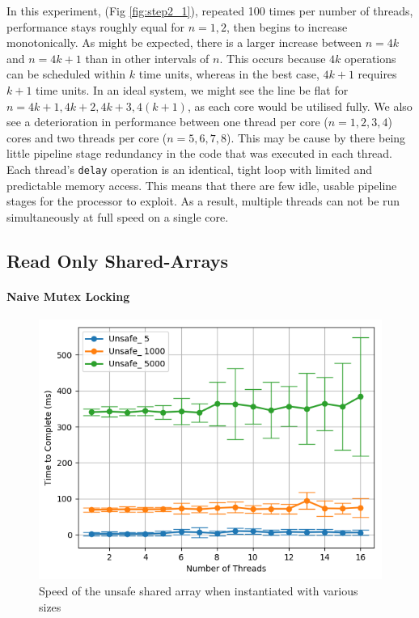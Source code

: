 \documentclass[11pt]{article}
\begin{document}
In this experiment, (Fig \ref{fig:step2_1}), repeated 100 times per number of threads, performance stays roughly equal for $n = 1, 2$, then begins to increase monotonically. As might be expected, there is a larger increase between $n= 4k$ and $n= 4k +1$ than in other intervals of $n$. This occurs because $4k$ operations can be scheduled within $k$ time units, whereas in the best case, $4k+1$ requires $k+1$ time units. In an ideal system, we might see the line be flat for $n = 4k+1, 4k+2, 4k+3, 4(k+1)$, as each core would be utilised fully. We also see a deterioration in performance between one thread per core ($n = 1, 2, 3, 4$) cores and two threads per core ($n = 5, 6, 7, 8$). This may be cause by there being little pipeline stage redundancy in the code that was executed in each thread. Each thread's \texttt{delay} operation is an identical, tight loop with limited and predictable memory access. This means that there are few idle, usable pipeline stages for the processor to exploit. As a result, multiple threads can not be run simultaneously at full speed on a single core.


\subsection{Read Only Shared-Arrays}
\paragraph{Naive Mutex Locking}

\begin{figure}
\centering
\includegraphics[scale=0.65]{step3_1.png}
\caption{Speed of the unsafe shared array when instantiated with various sizes}
\label{fig:step3_1}
\end{figure}
\end{document}
